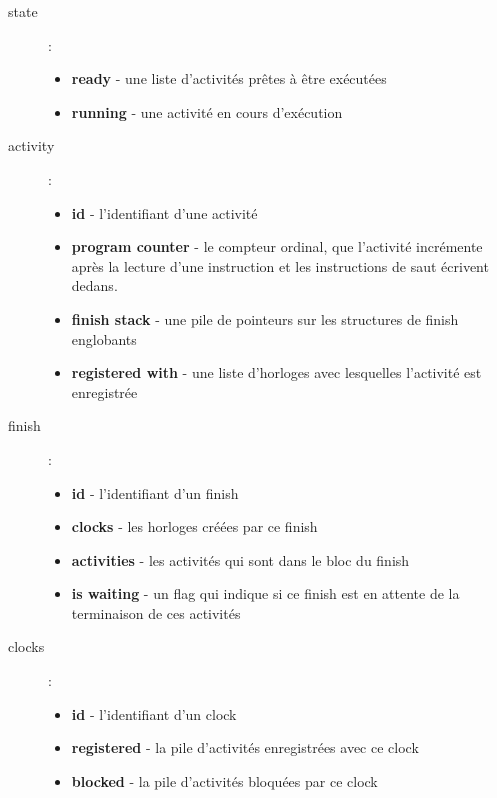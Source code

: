 \documentclass[12pt]{scrartcl}
\begin{document}
\begin{description}
  \item[state] : 
   
  \begin{itemize} 
    \item \textbf{ready} - une liste d'activités prêtes à être exécutées
    \item \textbf{running} - une activité en cours d'exécution
  \end{itemize} 

  \item[activity] : 
   
  \begin{itemize} 
    \item \textbf{id} - l'identifiant d'une activité
    \item \textbf{program counter} - le compteur ordinal, que l'activité incrémente après la lecture d'une instruction et les instructions de saut écrivent dedans.
    \item \textbf{finish stack} - une pile de pointeurs sur les structures de finish englobants
    \item \textbf{registered with} - une liste d'horloges avec lesquelles l'activité est enregistrée
  \end{itemize} 

  \item[finish] : 
   
    \begin{itemize} 
       \item \textbf{id} - l'identifiant d'un finish
       \item \textbf{clocks} - les horloges créées par ce finish
       \item \textbf{activities} - les activités qui sont dans le bloc du finish
       \item \textbf{is waiting} - un flag qui indique si ce finish est en attente de la terminaison de ces activités
    \end{itemize} 

  \item[clocks] : 
    
    \begin{itemize} 
      \item \textbf{id} - l'identifiant d'un clock
      \item \textbf{registered} - la pile d'activités enregistrées avec ce clock
      \item \textbf{blocked} - la pile d'activités bloquées par ce clock
    \end{itemize} 

\end{description}
\end{document}
